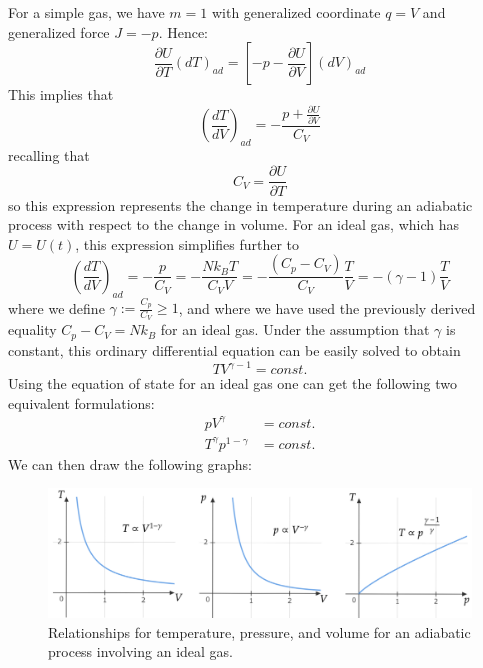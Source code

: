 \documentclass[12pt, a4paper, oneside, openright, titlepage]{book}
\begin{document}
\begin{eg}[Gas]
    For a simple gas, we have $m = 1$ with generalized coordinate $q = V$ and generalized force $J = -p$. Hence: \begin{equation*}
        \frac{\partial U}{\partial T}(dT)_{ad} = \left[-p - \frac{\partial U}{\partial V}\right](dV)_{ad}
    \end{equation*}
    This implies that \begin{equation*}
        \left(\frac{dT}{dV}\right)_{ad} = -\frac{p+\frac{\partial U}{\partial V}}{C_V}
    \end{equation*}
    recalling that \begin{equation*}
        C_V = \frac{\partial U}{\partial T}
    \end{equation*}
    so this expression represents the change in temperature during an adiabatic process with respect to the change in volume. For an ideal gas, which has $U = U(t)$, this expression simplifies further to \begin{equation*}
        \left(\frac{dT}{dV}\right)_{ad} = -\frac{p}{C_V} = -\frac{Nk_BT}{C_VV} = -\frac{(C_p-C_V)}{C_V}\frac{T}{V} = -(\gamma - 1)\frac{T}{V}
    \end{equation*}
    where we define $\gamma := \frac{C_p}{C_V} \geq 1$, and where we have used the previously derived equality $C_p - C_V = Nk_B$ for an ideal gas. Under the assumption that $\gamma$ is constant, this ordinary differential equation can be easily solved to obtain \begin{equation*}
        TV^{\gamma-1} = const.
    \end{equation*}
    Using the equation of state for an ideal gas one can get the following two equivalent formulations: \begin{align*}
        pV^{\gamma} &= const. \\
        T^{\gamma}p^{1-\gamma} &= const.
    \end{align*}
    We can then draw the following graphs:
    \begin{figure}[H]
        \centering
        \includegraphics[scale = 0.4]{Images/AdiabaticIdealGas.png}
        \caption{Relationships for temperature, pressure, and volume for an adiabatic process involving an ideal gas.}
    \end{figure}
\end{eg}
\end{document}
